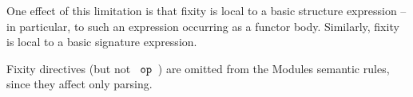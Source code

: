 One effect of this limitation is that fixity is local to a basic
structure expression -- in particular, to such an expression occurring
as a functor body. 
Similarly, fixity is local to a basic signature expression.

Fixity directives (but not ~${\tt op}$~) are omitted from the Modules semantic rules, since they affect only parsing.


